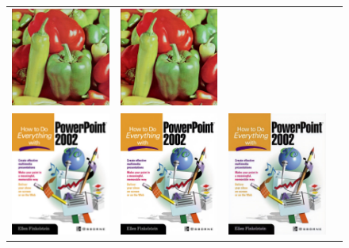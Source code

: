 \documentclass[10pt,twocolumn,letterpaper]{article}
\begin{document}
\begin{figure}[h!]
\begin{tabular}{cccc}
     	\includegraphics[width=1.5in]{images/used/appendix/jpg/Set14/pepper_SRGAN-VGG54} &
     	\includegraphics[width=1.5in]{images/used/appendix/jpg/Set14/pepper_HR} \\     	
     	\includegraphics[width=1.5in]{images/used/appendix/jpg/Set14/ppt3_bicubic}&
     	\includegraphics[width=1.5in]{images/used/appendix/jpg/Set14/ppt3_SRResNet-MSE} &
     	\includegraphics[width=1.5in]{images/used/appendix/jpg/Set14/ppt3_SRGAN-VGG54} &

\end{tabular}
\end{figure}
\end{document}
